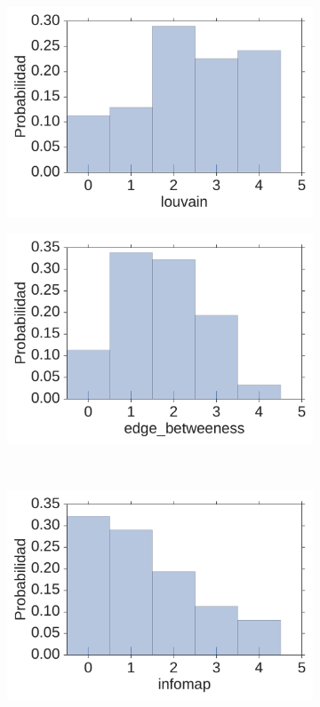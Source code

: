 {\begin{figure}[!ht]
    \centering
    \begin{subfigure}[b]{.45\columnwidth}
        \includegraphics[width=0.95\columnwidth]{figuras/louvain_probability.pdf}
    \end{subfigure}
    \begin{subfigure}[b]{.45\columnwidth}
        \includegraphics[width=0.95\columnwidth]{figuras/edge_betweeness_probability.pdf}
    \end{subfigure}\\
    \begin{subfigure}[b]{.45\columnwidth}
        \includegraphics[width=0.95\columnwidth]{figuras/infomap_probability.pdf}

\end{subfigure}
\end{figure}}
